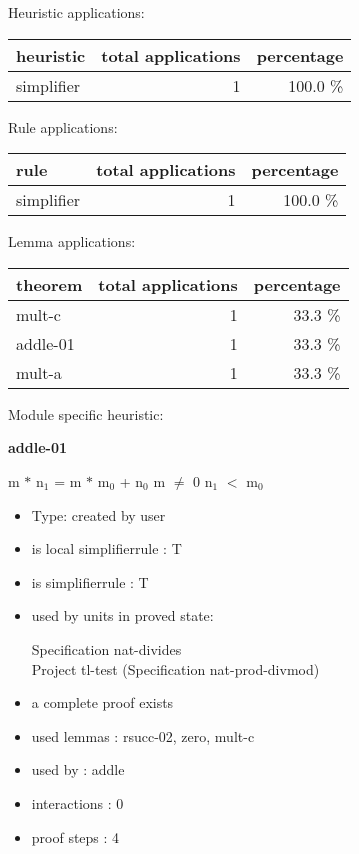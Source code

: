 \documentclass[a4paper]{article}
\begin{document}
\medskip


Heuristic applications:

\begin{supertabular}{l|r|r}
heuristic	& total applications & percentage \\ \hline
simplifier & 1 & 100.0 \% \\

\end{supertabular}

Rule applications:

\begin{supertabular}{l|r|r}
rule	        & total applications & percentage \\ \hline
simplifier & 1 & 100.0 \% \\

\end{supertabular}

Lemma applications:

\begin{supertabular}{l|r|r}
theorem	        & total applications & percentage \\ \hline
mult-c & 1 & 33.3 \% \\
addle-01 & 1 & 33.3 \% \\
mult-a & 1 & 33.3 \% \\

\end{supertabular}

Module specific heuristic:

\pagebreak

{\LARGE\bf addle-01}\label{lemma-addle-01}

\medskip

 \Fol m $*$ $\mbox{n}_{1}$ = m $*$ $\mbox{m}_{0}$ + $\mbox{n}_{0}$ \And m $\neq$ 0 \Imp \Not $\mbox{n}_{1}$ $<$ $\mbox{m}_{0}$

\begin{itemize}

\item Type: created by user

\item is local simplifierrule : T
\item is simplifierrule : T
\item used by units in proved state:

Specification nat-divides \\
Project tl-test (Specification nat-prod-divmod)
\item       a complete proof exists
\item       used lemmas  : rsucc-02, zero, mult-c
\item       used by      : addle
\item       interactions : 0
\item       proof steps  : 4
\end{itemize}
\end{document}

